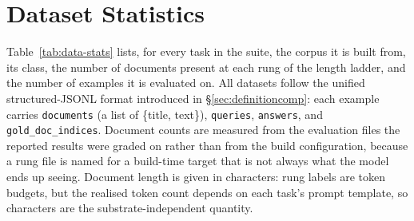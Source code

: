 \section{Dataset Statistics}
\label{app:data-stats}

\begin{claudeblock}
Table~\ref{tab:data-stats} lists, for every task in the suite, the corpus it is built from, its
\cname{} class, the number of documents present at each rung of the length ladder, and the number
of examples it is evaluated on. All datasets follow the unified structured-JSONL format introduced
in \S\ref{sec:definitioncomp}: each example carries \texttt{documents} (a list of \{title, text\}),
\texttt{queries}, \texttt{answers}, and \texttt{gold\_doc\_indices}. Document counts are measured
from the evaluation files the reported results were graded on rather than from the build
configuration, because a rung file is named for a build-time target that is not always what the
model ends up seeing. Document length is given in characters: rung labels are token budgets, but
the realised token count depends on each task's prompt template, so characters are the
substrate-independent quantity.
\end{claudeblock}



